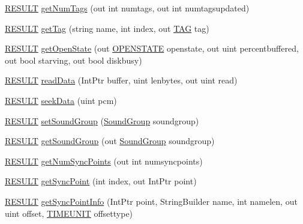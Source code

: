 \begin{DoxyCompactItemize}
\item 
\hyperlink{namespace_f_m_o_d_a305d1176ef3f8c8815861a60407ac33d}{R\+E\+S\+U\+LT} \hyperlink{class_f_m_o_d_1_1_sound_ab27425821f31a3604111036436e7f165}{get\+Num\+Tags} (out int numtags, out int numtagsupdated)
\item 
\hyperlink{namespace_f_m_o_d_a305d1176ef3f8c8815861a60407ac33d}{R\+E\+S\+U\+LT} \hyperlink{class_f_m_o_d_1_1_sound_a792d78fc59da623296625a408204c605}{get\+Tag} (string name, int index, out \hyperlink{struct_f_m_o_d_1_1_t_a_g}{T\+AG} tag)
\item 
\hyperlink{namespace_f_m_o_d_a305d1176ef3f8c8815861a60407ac33d}{R\+E\+S\+U\+LT} \hyperlink{class_f_m_o_d_1_1_sound_a3f44b26ec0592180feafc78b35d98f15}{get\+Open\+State} (out \hyperlink{namespace_f_m_o_d_a9f6c0e7171206891a54ae2a2ba257000}{O\+P\+E\+N\+S\+T\+A\+TE} openstate, out uint percentbuffered, out bool starving, out bool diskbusy)
\item 
\hyperlink{namespace_f_m_o_d_a305d1176ef3f8c8815861a60407ac33d}{R\+E\+S\+U\+LT} \hyperlink{class_f_m_o_d_1_1_sound_ae6890433430ac375f36a0792ddd675ce}{read\+Data} (Int\+Ptr buffer, uint lenbytes, out uint read)
\item 
\hyperlink{namespace_f_m_o_d_a305d1176ef3f8c8815861a60407ac33d}{R\+E\+S\+U\+LT} \hyperlink{class_f_m_o_d_1_1_sound_aead3642d75d68acbe010a7dfeccb37f6}{seek\+Data} (uint pcm)
\item 
\hyperlink{namespace_f_m_o_d_a305d1176ef3f8c8815861a60407ac33d}{R\+E\+S\+U\+LT} \hyperlink{class_f_m_o_d_1_1_sound_ac492a2be49984503d3e0f9cbfcc3692c}{set\+Sound\+Group} (\hyperlink{class_f_m_o_d_1_1_sound_group}{Sound\+Group} soundgroup)
\item 
\hyperlink{namespace_f_m_o_d_a305d1176ef3f8c8815861a60407ac33d}{R\+E\+S\+U\+LT} \hyperlink{class_f_m_o_d_1_1_sound_a0fe1b9bd666f25faafd5a93167a2580c}{get\+Sound\+Group} (out \hyperlink{class_f_m_o_d_1_1_sound_group}{Sound\+Group} soundgroup)
\item 
\hyperlink{namespace_f_m_o_d_a305d1176ef3f8c8815861a60407ac33d}{R\+E\+S\+U\+LT} \hyperlink{class_f_m_o_d_1_1_sound_ad71e361cb6405b056802505d6487cc7f}{get\+Num\+Sync\+Points} (out int numsyncpoints)
\item 
\hyperlink{namespace_f_m_o_d_a305d1176ef3f8c8815861a60407ac33d}{R\+E\+S\+U\+LT} \hyperlink{class_f_m_o_d_1_1_sound_a8d113568f0a7c1ab2a79c4a91fa88c02}{get\+Sync\+Point} (int index, out Int\+Ptr point)
\item 
\hyperlink{namespace_f_m_o_d_a305d1176ef3f8c8815861a60407ac33d}{R\+E\+S\+U\+LT} \hyperlink{class_f_m_o_d_1_1_sound_a0e37bd556d8b73fae8aec254cd0deeca}{get\+Sync\+Point\+Info} (Int\+Ptr point, String\+Builder name, int namelen, out uint offset, \hyperlink{namespace_f_m_o_d_aff20975332f93ff2180d2681cb43929f}{T\+I\+M\+E\+U\+N\+IT} offsettype)

\end{DoxyCompactItemize}
